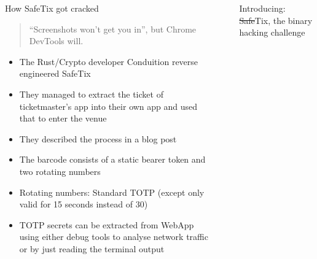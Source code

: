 \documentclass[final,dvipsnames]{beamer}
\newlength{\sepwidth}
\newlength{\colwidth}
\newcommand{\separatorcolumn}{\begin{column}{\sepwidth}\end{column}}
\begin{document}
\begin{frame}[t, fragile]
\begin{columns}[t]
\begin{column}{\colwidth}
    \begin{block}{How SafeTix got cracked}
        \begin{quotation}
            “Screenshots won’t get you in”, but Chrome DevTools will.
        \end{quotation}
        \begin{itemize}
            \item The Rust/Crypto developer Conduition reverse engineered SafeTix
            \item They managed to extract the ticket of ticketmaster's app into their own app and used that to enter the venue
            \item They described the process in a blog post \cite{reverse_engineering_ticketmaster}
            \item The barcode consists of a static bearer token and two rotating numbers \cite{reverse_engineering_ticketmaster}
            \item Rotating numbers: Standard TOTP (except only valid for 15 seconds instead of 30)
            \item TOTP secrets can be extracted from WebApp using either debug tools to analyse network traffic or by just reading the terminal output
        \end{itemize}
    \end{block}
\end{column}

\separatorcolumn

\begin{column}{\colwidth}

    \begin{block}{Introducing: \sout{Safe}Tix, the binary hacking challenge}


\end{block}
\end{column}
\end{columns}
\end{frame}
\end{document}
